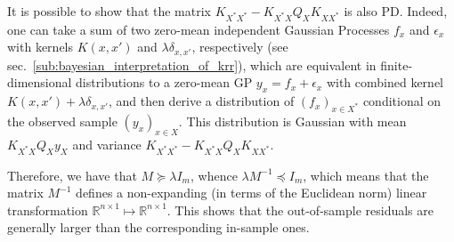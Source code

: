 \documentclass[a4paper,14pt]{extarticle}
\newcommand{\Real}{\mathbb{R}}
\begin{document}
It is possible to show that the matrix $K_{X^*X^*} - K_{X^*X} Q_X K_{XX^*}$ is also
PD. Indeed, one can take a sum of two zero-mean independent Gaussian Processes $f_x$
and $\epsilon_x$ with kernels $K(x,x')$ and $\lambda \delta_{x,x'}$, respectively
(see sec.~\ref{sub:bayesian_interpretation_of_krr}), which are equivalent in finite-
dimensional distributions to a zero-mean GP $y_x=f_x+\epsilon_x$ with combined kernel
$K(x,x') + \lambda \delta_{x,x'}$, and then derive a distribution of $(f_x)_{x\in X^*}$
conditional on the observed sample $(y_x)_{x\in X}$. This distribution is Gaussian
with mean $K_{X^*X}Q_X y_X$ and variance $K_{X^*X^*} - K_{X^*X} Q_X K_{XX^*}$.

Therefore, we have that $M \succeq \lambda I_m$, whence $\lambda M^{-1} \preceq I_m$,
which means that the matrix $M^{-1}$ defines a non-expanding (in terms of the Euclidean
norm) linear transformation $\Real^{n\times 1} \mapsto \Real^{n\times 1}$. This shows
that the out-of-sample residuals are generally larger than the corresponding in-sample
ones.
\end{document}
